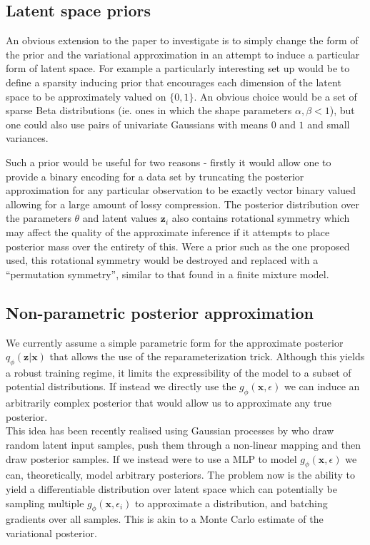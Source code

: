 \documentclass[../report.tex]{subfiles}
\begin{document}
\subsection{Latent space priors}
An obvious extension to the paper to investigate is to simply change the form of the prior and the variational approximation in an attempt to induce a particular form of latent space. For example a particularly interesting set up would be to define a sparsity inducing prior that encourages each dimension of the latent space to be approximately valued on $\{0, 1\}$. An obvious choice would be a set of sparse Beta distributions (ie. ones in which the shape parameters $\alpha, \beta < 1$), but one could also use pairs of univariate Gaussians with means $0$ and $1$ and small variances.

Such a prior would be useful for two reasons - firstly it would allow one to provide a binary encoding for a data set by truncating the posterior approximation for any particular observation to be exactly vector binary valued allowing for a large amount of lossy compression. The posterior distribution over the parameters $\theta$ and latent values $\mathbf{z}_i$ also contains rotational symmetry which may affect the quality of the approximate inference if it attempts to place posterior mass over the entirety of this. Were a prior such as the one proposed used, this rotational symmetry would be destroyed and replaced with a ``permutation symmetry'', similar to that found in a finite mixture model.
\\
\subsection{Non-parametric posterior approximation}
We currently assume a simple parametric form for the approximate posterior $q_\phi(\mathbf{z}|\mathbf{x})$ that allows the use of the reparameterization trick. Although this yields a robust training regime, it limits the expressibility of the model to a subset of potential distributions. If instead we directly use the $g_\phi(\mathbf{x}, \epsilon)$ we can induce an arbitrarily complex posterior that would allow us to approximate any true posterior.\\
This idea has been recently realised using Gaussian processes by \cite{tran2015variational} who draw random latent input samples, push them through a non-linear mapping and then draw posterior samples. If we instead were to use a MLP to model $g_\phi(\mathbf{x}, \epsilon)$ we can, theoretically, model arbitrary posteriors. The problem now is the ability to yield a differentiable distribution over latent space which can potentially be sampling multiple $g_\phi(\mathbf{x}, \epsilon_i)$ to approximate a distribution, and batching gradients over all samples. This is akin to a Monte Carlo estimate of the variational posterior.
\end{document}
